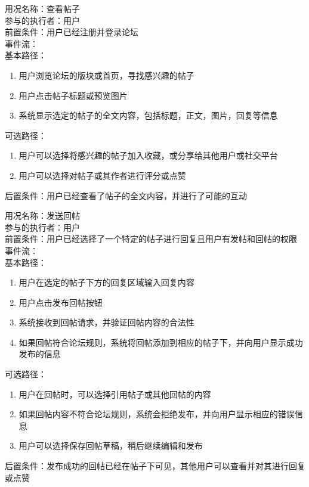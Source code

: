 \begin{framed}
\noindent
用况名称：查看帖子\\
参与的执行者：用户\\
前置条件：用户已经注册并登录论坛\\
事件流：\\
基本路径：
\begin{enumerate}[itemsep=2pt,topsep=0pt,parsep=0pt,itemindent=1em]
    \item 用户浏览论坛的版块或首页，寻找感兴趣的帖子
    \item 用户点击帖子标题或预览图片
    \item 系统显示选定的帖子的全文内容，包括标题，正文，图片，回复等信息
\end{enumerate}
\noindent
可选路径：\par
   \begin{enumerate}[itemsep=2pt,topsep=0pt,parsep=0pt,itemindent=1em]  
       \item 用户可以选择将感兴趣的帖子加入收藏，或分享给其他用户或社交平台 
       \item 用户可以选择对帖子或其作者进行评分或点赞
   \end{enumerate} 
后置条件：用户已经查看了帖子的全文内容，并进行了可能的互动
\end{framed}

\begin{framed}
\noindent
用况名称：发送回帖\\
参与的执行者：用户\\
前置条件：用户已经选择了一个特定的帖子进行回复且用户有发帖和回帖的权限\\
事件流：\\
基本路径：
\begin{enumerate}[itemsep=2pt,topsep=0pt,parsep=0pt,itemindent=1em]
    \item 用户在选定的帖子下方的回复区域输入回复内容
    \item 用户点击发布回帖按钮
    \item 系统接收到回帖请求，并验证回帖内容的合法性
    \item 如果回帖符合论坛规则，系统将回帖添加到相应的帖子下，并向用户显示成功发布的信息
    \end{enumerate}
\noindent
可选路径：\par
   \begin{enumerate}[itemsep=2pt,topsep=0pt,parsep=0pt,itemindent=1em]  
       \item 用户在回帖时，可以选择引用帖子或其他回帖的内容
       \item 如果回帖内容不符合论坛规则，系统会拒绝发布，并向用户显示相应的错误信息
       \item 用户可以选择保存回帖草稿，稍后继续编辑和发布
   \end{enumerate} 
后置条件：发布成功的回帖已经在帖子下可见，其他用户可以查看并对其进行回复或点赞
\end{framed}

